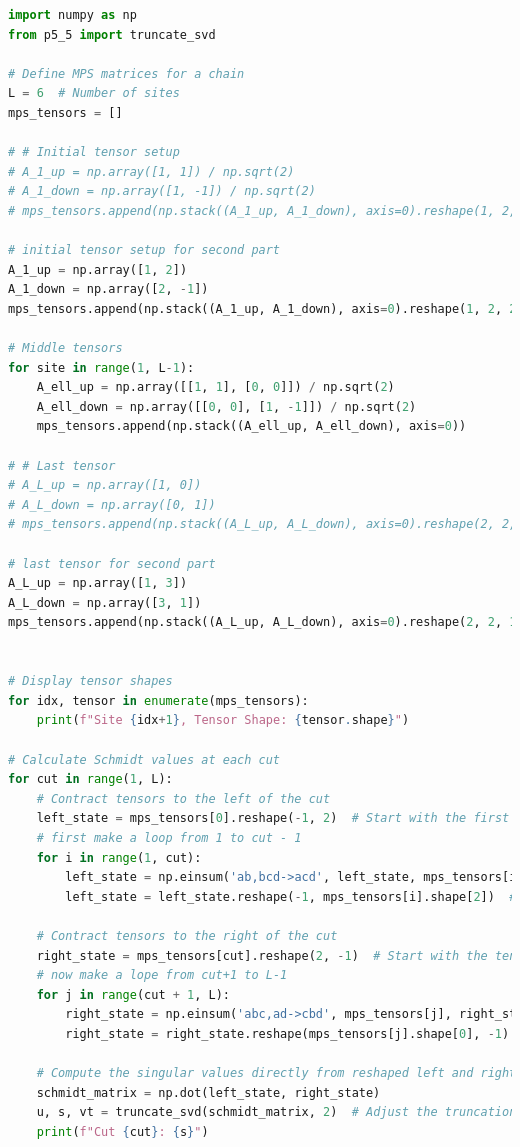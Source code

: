 \documentclass[12pt]{article}
\begin{document}
\begin{lstlisting}[language=Python]
import numpy as np
from p5_5 import truncate_svd

# Define MPS matrices for a chain
L = 6  # Number of sites
mps_tensors = []

# # Initial tensor setup
# A_1_up = np.array([1, 1]) / np.sqrt(2)
# A_1_down = np.array([1, -1]) / np.sqrt(2)
# mps_tensors.append(np.stack((A_1_up, A_1_down), axis=0).reshape(1, 2, 2))  # First tensor

# initial tensor setup for second part
A_1_up = np.array([1, 2])
A_1_down = np.array([2, -1])
mps_tensors.append(np.stack((A_1_up, A_1_down), axis=0).reshape(1, 2, 2))  # First tensor

# Middle tensors
for site in range(1, L-1):
    A_ell_up = np.array([[1, 1], [0, 0]]) / np.sqrt(2)
    A_ell_down = np.array([[0, 0], [1, -1]]) / np.sqrt(2)
    mps_tensors.append(np.stack((A_ell_up, A_ell_down), axis=0))

# # Last tensor
# A_L_up = np.array([1, 0])
# A_L_down = np.array([0, 1])
# mps_tensors.append(np.stack((A_L_up, A_L_down), axis=0).reshape(2, 2, 1))  # Last tensor

# last tensor for second part
A_L_up = np.array([1, 3])
A_L_down = np.array([3, 1])
mps_tensors.append(np.stack((A_L_up, A_L_down), axis=0).reshape(2, 2, 1))  # Last tensor


# Display tensor shapes
for idx, tensor in enumerate(mps_tensors):
    print(f"Site {idx+1}, Tensor Shape: {tensor.shape}")

# Calculate Schmidt values at each cut
for cut in range(1, L):
    # Contract tensors to the left of the cut
    left_state = mps_tensors[0].reshape(-1, 2)  # Start with the first tensor reshaped for matrix multiplication
    # first make a loop from 1 to cut - 1
    for i in range(1, cut):
        left_state = np.einsum('ab,bcd->acd', left_state, mps_tensors[i])
        left_state = left_state.reshape(-1, mps_tensors[i].shape[2])  # Ensure correct shape

    # Contract tensors to the right of the cut
    right_state = mps_tensors[cut].reshape(2, -1)  # Start with the tensor at the cut
    # now make a lope from cut+1 to L-1
    for j in range(cut + 1, L):
        right_state = np.einsum('abc,ad->cbd', mps_tensors[j], right_state)
        right_state = right_state.reshape(mps_tensors[j].shape[0], -1)  # Ensure correct shape

    # Compute the singular values directly from reshaped left and right states
    schmidt_matrix = np.dot(left_state, right_state)
    u, s, vt = truncate_svd(schmidt_matrix, 2)  # Adjust the truncation
    print(f"Cut {cut}: {s}")
\end{lstlisting}
\end{document}
